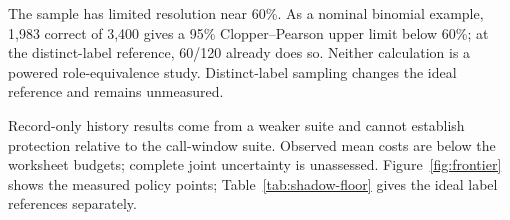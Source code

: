 The sample has limited resolution near 60\%. As a nominal binomial example, 1,983 correct of 3,400 gives a 95\% Clopper--Pearson upper limit below 60\%; at the distinct-label reference, 60/120 already does so. Neither calculation is a powered role-equivalence study. Distinct-label sampling changes the ideal reference and remains unmeasured.

Record-only history results come from a weaker suite and cannot establish protection relative to the call-window suite. Observed mean costs are below the worksheet budgets; complete joint uncertainty is unassessed. Figure~\ref{fig:frontier} shows the measured policy points; Table~\ref{tab:shadow-floor} gives the ideal label references separately.


